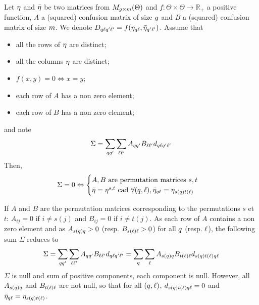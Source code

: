 \begin{lemme}\label{lemme:casdegalite}\textbf{}

Let $\eta$ and $\bar{\eta}$ be two matrices from $M_{g \times m}(\Theta)$ and $f: \Theta \times \Theta \to \mathbb{R_+}$ a positive function, $A$ a (squared) confusion matrix of size $g$ and $B$ a (squared) confusion matrix of size $m$. We denote $D_{q\ell q'\ell'} = f(\eta_{q\ell}, \bar{\eta}_{q'\ell'})$. Assume that
\begin{itemize}
\item all the rows of $\eta$ are distinct;
\item all the columns $\eta$ are distinct;
\item $f(x,y) = 0 \Leftrightarrow x = y$;
\item each  row of $A$ has a non zero element;
\item each  row of $B$ has a non zero element;
\end{itemize}
and note
\begin{equation}
\label{eq:casdegalite}
\Sigma = \sum_{\kk \kk'} \sum_{\el \el'} A_{\kk \kk'} B_{\el \el'} d_{\kk\el\kk'\el'}
\end{equation}
Then,
\begin{equation*}
  \Sigma = 0 \Leftrightarrow \begin{cases}
    A, B \text{ are permutation matrices } s,t & \\
    \bar{\etaa} = \etaa^{s, t} \text{ cad } \forall (\kk, \el), \bar{\etaa}_{\kk\el} = \etaa_{s(\kk) t(\el)} &
  \end{cases}
\end{equation*}
\end{lemme}
\proofbegin
If $A$ and $B$ are the permutation matrices corresponding to the permutations $s$ et $t$: $A_{ij} = 0$ if $i \neq s(j)$ and $B_{ij} = 0$ if $i \neq t(j)$. As each row of $A$ contains a non zero element  and as $A_{s(q)q} > 0$ (resp. $B_{s(\ell)\ell} > 0$) for all $q$ (resp. $\ell$), the following sum $\Sigma$ reduces to
\begin{equation*}
  \Sigma = \sum_{\kk \kk'} \sum_{\el \el'} A_{\kk \kk'} B_{\el \el'} d_{\kk\el\kk'\el'} = \sum_{\kk} \sum_{\el} A_{s(\kk)\kk} B_{t(\el)\el} d_{s(\kk)t(\el) \kk\el}
\end{equation*}
$\Sigma$ is null and sum of positive components, each component is null. However, all $A_{s(q)q}$ and $B_{t(\ell)\ell}$ are not null, so that for all $(q, \ell)$, $d_{s(q)t(\ell) q\ell} = 0$ and $\bar{\eta}_{q\ell} = \eta_{s(q) t(\ell)}$.\\
